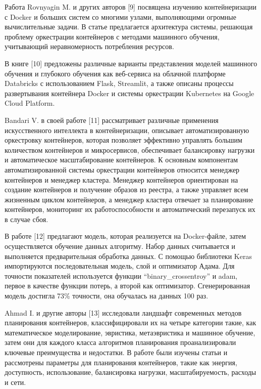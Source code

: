 \begin{multicols}{2}
Работа Rovnyagin M. и других авторов {[}9{]} посвящена изучению
контейнеризации с Docker и больших систем со многими узлами,
выполняющими огромные вычислительные задачи. В статье предлагается
архитектура системы, решающая проблему оркестрации контейнеров с
методами машинного обучения, учитывающий неравномерность потребления
ресурсов.

В книге {[}10{]} предложены различные варианты представления моделей
машинного обучения и глубокого обучения как веб-сервиса на облачной
платформе Databricks с использованием Flask, Streamlit, а также описаны
процессы развертывания контейнера Docker и системы оркестрации
Kubernetes на Google Cloud Platform.

Bandari V. в своей работе {[}11{]} рассматривает различные применения
искусственного интеллекта в контейнеризации, описывает
автоматизированную оркестровку контейнеров, которая позволяет эффективно
управлять большим количеством контейнеров и микросервисов, обеспечивает
балансировку нагрузки и автоматическое масштабирование контейнеров. К
основным компонентам автоматизированной системы оркестрации контейнеров
относится менеджер контейнеров и менеджер кластера. Менеджер контейнеров
ориентирован на создание контейнеров и получение образов из реестра, а
также управляет всем жизненным циклом контейнеров, а менеджер кластера
отвечает за планирование контейнеров, мониторинг их работоспособности и
автоматический перезапуск их в случае сбоя.

В работе {[}12{]} предлагают модель, которая реализуется на
Docker-файле, затем осуществляется обучение данных алгоритму. Набор
данных считывается и выполняется предварительная обработка данных. С
помощью библиотеки Keras импортируются последовательная модель, слой и
оптимизатор Адама. Для точности показателей используется функции
``binary\_crossentroy'' и adam, первое в качестве функции потерь, а
второй как оптимизатор. Сгенерированная модель достигла 73\% точности,
она обучалась на данных 100 раз.

Ahmad I. и другие авторы {[}13{]} исследовали ландшафт современных
методов планирования контейнеров, классифицировали их на четыре
категории такие, как математическое моделирование, эвристика,
метаэвристика и машинное обучение, затем они для каждого класса
алгоритмов планирования проанализировали ключевые преимущества и
недостатки. В работе были изучены статьи и рассмотрены параметры для
планирования контейнеров, такие как энергия, доступность, использование,
балансировка нагрузки, масштабируемость, расходы и сети.


\end{multicols}
